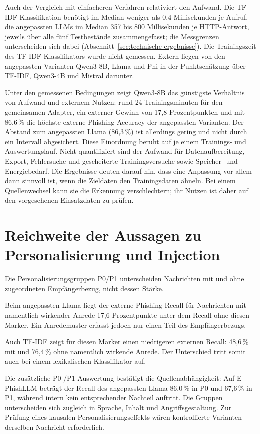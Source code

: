 \documentclass[12pt,twoside=false,a4paper,parskip]{scrbook}
\begin{document}
Auch der Vergleich mit einfacheren Verfahren relativiert den Aufwand. Die TF-IDF-Klassifikation benötigt im Median weniger als 0{,}4 Millisekunden je Aufruf, die angepassten LLMs im Median 357 bis 800 Millisekunden je HTTP-Antwort, jeweils über alle fünf Testbestände zusammengefasst; die Messgrenzen unterscheiden sich dabei (Abschnitt~\ref{sec:technische-ergebnisse}). Die Trainingszeit des TF-IDF-Klassifikators wurde nicht gemessen. Extern liegen von den angepassten Varianten Qwen3-8B, Llama und Phi in der Punktschätzung über TF-IDF, Qwen3-4B und Mistral darunter.

Unter den gemessenen Bedingungen zeigt Qwen3-8B das günstigste Verhältnis von Aufwand und externem Nutzen: rund 24 Trainingsminuten für den gemeinsamen Adapter, ein externer Gewinn von 17{,}8 Prozentpunkten und mit 86{,}6\,\% die höchste externe Phishing-Accuracy der angepassten Varianten. Der Abstand zum angepassten Llama (86{,}3\,\%) ist allerdings gering und nicht durch ein Intervall abgesichert. Diese Einordnung beruht auf je einem Trainings- und Auswertungslauf. Nicht quantifiziert sind der Aufwand für Datenaufbereitung, Export, Fehlersuche und gescheiterte Trainingsversuche sowie Speicher- und Energiebedarf. Die Ergebnisse deuten darauf hin, dass eine Anpassung vor allem dann sinnvoll ist, wenn die Zieldaten den Trainingsdaten ähneln. Bei einem Quellenwechsel kann sie die Erkennung verschlechtern; ihr Nutzen ist daher auf den vorgesehenen Einsatzdaten zu prüfen.

\section{Reichweite der Aussagen zu Personalisierung und Injection}\label{sec:auswirkungen}

Die Personalisierungsgruppen P0/P1 unterscheiden Nachrichten mit und ohne zugeordneten Empfängerbezug, nicht dessen Stärke.

Beim angepassten Llama liegt der externe Phishing-Recall für Nachrichten mit namentlich wirkender Anrede 17{,}6 Prozentpunkte unter dem Recall ohne diesen Marker. Ein Anredemuster erfasst jedoch nur einen Teil des Empfängerbezugs.

Auch TF-IDF zeigt für diesen Marker einen niedrigeren externen Recall: 48{,}6\,\% mit und 76{,}4\,\% ohne namentlich wirkende Anrede. Der Unterschied tritt somit auch bei einem lexikalischen Klassifikator auf.

Die zusätzliche P0-/P1-Auswertung bestätigt die Quellenabhängigkeit: Auf E-PhishLLM beträgt der Recall des angepassten Llama 86{,}0\,\% in P0 und 67{,}6\,\% in P1, während intern kein entsprechender Nachteil auftritt. Die Gruppen unterscheiden sich zugleich in Sprache, Inhalt und Angriffsgestaltung. Zur Prüfung eines kausalen Personalisierungseffekts wären kontrollierte Varianten derselben Nachricht erforderlich.
\end{document}
